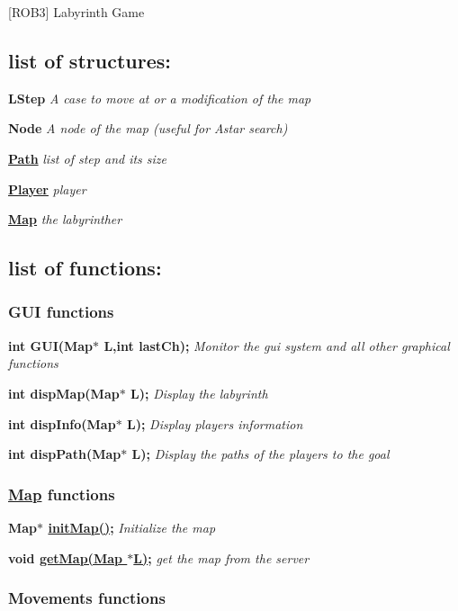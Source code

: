 \mbox{[}R\+O\+B3\mbox{]} Labyrinth Game

\subsection*{list of structures\+:}

{\bfseries L\+Step} {\itshape A case to move at or a modification of the map}

{\bfseries Node} {\itshape A node of the map (useful for Astar search)}

{\bfseries \hyperlink{struct_path}{Path}} {\itshape list of step and its size}

{\bfseries \hyperlink{struct_player}{Player}} {\itshape player}

{\bfseries \hyperlink{struct_map}{Map}} {\itshape the labyrinther}

\subsection*{list of functions\+:}

\subsubsection*{G\+UI functions}

{\bfseries int G\+U\+I(\+Map$\ast$ L,int last\+Ch);} {\itshape Monitor the gui system and all other graphical functions}

{\bfseries int disp\+Map(\+Map$\ast$ L);} {\itshape Display the labyrinth}

{\bfseries int disp\+Info(\+Map$\ast$ L);} {\itshape Display players\textquotesingle{} information}

{\bfseries int disp\+Path(\+Map$\ast$ L);} {\itshape Display the paths of the players to the goal}

\subsubsection*{\hyperlink{struct_map}{Map} functions}

{\bfseries Map$\ast$ \hyperlink{mapping_8h_af7560ce2af2a08abe0b230e7ba56cf45}{init\+Map()};} {\itshape Initialize the map}

{\bfseries void \hyperlink{mapping_8h_acd86842943223c3da418c5981befabf6}{get\+Map(\+Map $\ast$\+L)};} {\itshape get the map from the server} \subsubsection*{Movements functions}

